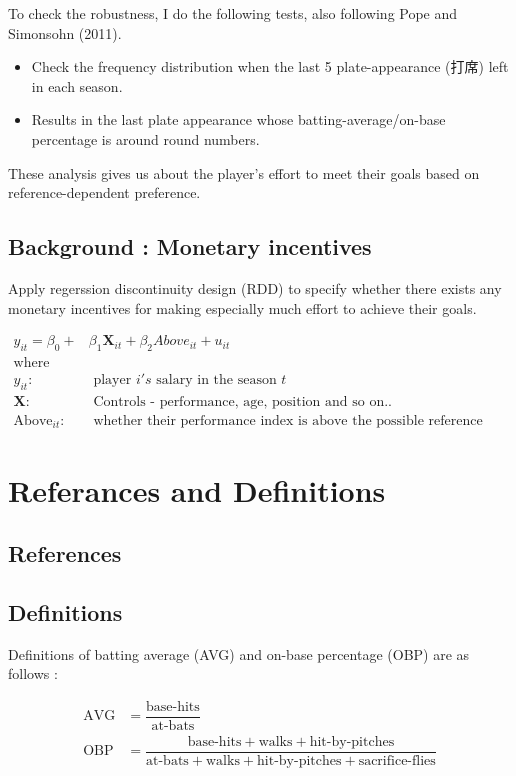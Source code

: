 \documentclass{jsarticle}[12pt]
\begin{document}
 To check the robustness, I do the following tests, also following Pope and Simonsohn (2011).
 
  \begin{itemize}
  
  \item Check the frequency distribution when the last 5 plate-appearance (打席) left in each season.
  
  \item Results in the last plate appearance whose batting-average/on-base percentage is around round numbers.
  
  \end{itemize}
 
 These analysis gives us about the player's effort to meet their goals based on reference-dependent preference.
 
 \subsection{Background : Monetary incentives}
 
 Apply regerssion discontinuity design (RDD) to specify whether there exists any monetary incentives for making especially much effort to achieve their goals.
 
  \begin{align*}
   y_{it} = \beta_0 + &\beta_1 \mathbf{X}_{it} + \beta_2 \textit{Above}_{it} + u_{it} \\
   \text{where } & \\
   y_{it} : & \text{ player } i's \text{ salary in the season } t \\
   \mathbf{X} : & \text{ Controls - performance, age, position and so on..} \\
   \text{Above}_{it} : & \text{ whether their performance index is above the possible reference point}
   \end{align*}
 
\section{Referances and Definitions}

 \subsection{References}
 
 
 
 \subsection{Definitions}
 
 Definitions of batting average (AVG) and on-base percentage (OBP) are as follows :
 
 \begin{align*}
\text{AVG} &= \dfrac{\text{base-hits}}{\text{at-bats}} \\
\text{OBP} &= \dfrac{\text{base-hits} + \text{walks} + \text{hit-by-pitches}} 
{\text{at-bats} + \text{walks} + \text{hit-by-pitches} + \text{sacrifice-flies}} \\
\end{align*}
\end{document}
